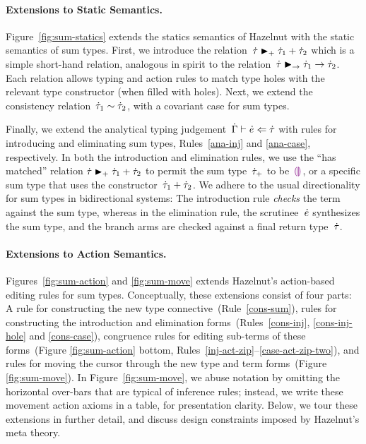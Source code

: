 \paragraph{Extensions to Static Semantics.}
Figure~\ref{fig:sum-statics} extends the statics semantics of Hazelnut
with the static semantics of sum types.
%
First, we introduce the
relation~$\dot{\tau} \mathrel{\textcolor{black}{\blacktriangleright_{+}}} {\dot{\tau}_1} + {\dot{\tau}_2}$ which is a
simple short-hand relation, analogous in spirit to the
relation~$\dot{\tau} \blacktriangleright_{\rightarrow} \dot{\tau}_1 \rightarrow \dot{\tau}_2$.  Each relation
allows typing and action rules to match type holes with the relevant
type constructor (when filled with holes).
%
Next, we extend the consistency relation~$\dot{\tau}_1 \sim \dot{\tau}_2$,
with a covariant case for sum types.

Finally, we extend the analytical typing
judgement~$\dot{\Gamma} \vdash \dot{e} \Leftarrow \dot{\tau}$ with rules for introducing
and eliminating sum types, Rules~\ref{ana-inj} and \ref{ana-case},
respectively.
%
In both the introduction and elimination rules, we use the ``has
matched'' relation $\dot{\tau} \mathrel{\textcolor{black}{\blacktriangleright_{+}}} {\dot{\tau}_1} + {\dot{\tau}_2}$ to
permit the sum type~$\dot{\tau}_+$ to be~$\textcolor{violet}{\llparenthesis}\textcolor{violet}{\rrparenthesis}$, or a specific sum type
that uses the constructor~$\dot{\tau}_1 + \dot{\tau}_2$.
%
We adhere to the usual directionality for sum types in bidirectional
 systems: The introduction rule \emph{checks} the term against the sum
 type, whereas in the elimination rule, the scrutinee~$\dot{e}$
 synthesizes the sum type, and the branch arms are checked against a
 final return type~$\dot{\tau}$.
%


\paragraph{Extensions to Action Semantics.}
Figures~\ref{fig:sum-action} and \ref{fig:sum-move} extends Hazelnut's
action-based editing rules for sum types.
%
Conceptually, these extensions consist of four parts: A rule for
constructing the new type connective~(Rule~\ref{cons-sum}), 
%
rules for constructing the introduction and elimination
forms~(Rules~\ref{cons-inj}, \ref{cons-inj-hole} and \ref{cons-case}),
%
congruence rules for editing sub-terms of these
forms~(Figure \ref{fig:sum-action} bottom, Rules~\ref{inj-act-zip}--\ref{case-act-zip-two}),
%
and rules for moving the cursor through the new type and term
forms~(Figure \ref{fig:sum-move}).  In Figure~\ref{fig:sum-move}, we
abuse notation by omitting the horizontal over-bars that are typical
of inference rules; instead, we write these movement action axioms in
a table, for presentation clarity.
%
Below, we tour these extensions in further detail, and discuss design
constraints imposed by Hazelnut's meta theory.

